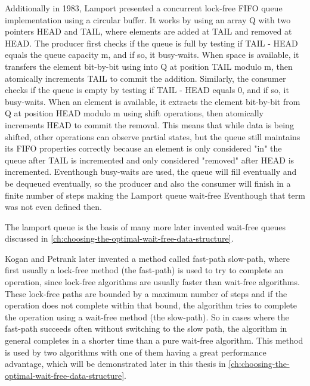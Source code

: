 Additionally in 1983, Lamport presented a concurrent lock-free \ac{FIFO} queue implementation using a circular buffer. It works by using an array Q with two pointers HEAD and TAIL, where elements are added at TAIL and removed at HEAD. The producer first checks if the queue is full by testing if TAIL - HEAD equals the queue capacity m, and if so, it busy-waits. When space is available, it transfers the element bit-by-bit using into Q at position TAIL modulo m, then atomically increments TAIL to commit the addition. Similarly, the consumer checks if the queue is empty by testing if TAIL - HEAD equals 0, and if so, it busy-waits. When an element is available, it extracts the element bit-by-bit from Q at position HEAD modulo m using shift operations, then atomically increments HEAD to commit the removal. This means that while data is being shifted, other operations can observe partial states, but the queue still maintains its \ac{FIFO} properties correctly because an element is only considered "in" the queue after TAIL is incremented and only considered "removed" after HEAD is incremented. Eventhough busy-waits are used, the queue will fill eventually and be dequeued eventually, so the producer and also the consumer will finish in a finite number of steps making the Lamport queue wait-free Eventhough that term was not even defined then. \cite{Lamport1983SPSCCircularBuffer} 

The lamport queue is the basis of many more later invented wait-free queues discussed in \cref{ch:choosing-the-optimal-wait-free-data-structure}.

Kogan and Petrank later invented a method called fast-path slow-path, where first usually a lock-free method (the fast-path) is used to try to complete an operation, since lock-free algorithms are usually faster than wait-free algorithms. These lock-free paths are bounded by a maximum number of steps and if the operation does not complete within that bound, the algorithm tries to complete the operation using a wait-free method (the slow-path). So in cases where the fast-path succeeds often without switching to the slow path, the algorithm in general completes in a shorter time than a pure wait-free algorithm. This method is used by two algorithms with one of them having a great performance advantage, which will be demonstrated later in this thesis in \cref{ch:choosing-the-optimal-wait-free-data-structure}. \cite{kogan2012methodology}